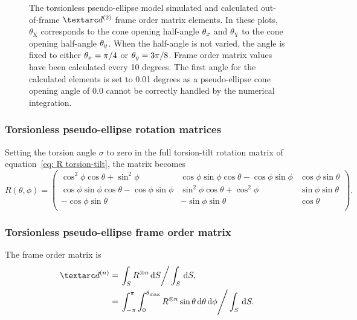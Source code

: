 \begin{figure}
\begin{tabular}{@{}cc@{}}
  \end{tabular}
  \caption[Torsionless pseudo-ellipse simulated and calculated out-of-frame $\FOtwo$ elements.]{
    The torsionless pseudo-ellipse model simulated and calculated out-of-frame $\FOtwo$ frame order matrix elements.
    In these plots, $\theta_\textrm{X}$ corresponds to the cone opening half-angle $\theta_x$ and $\theta_\textrm{Y}$ to the cone opening half-angle $\theta_y$.
    When the half-angle is not varied, the angle is fixed to either $\theta_x = \pi/4$ or $\theta_y = 3\pi/8$.
    Frame order matrix values have been calculated every 10 degrees.
    The first angle for the calculated elements is set to 0.01 degrees as a pseudo-ellipse cone opening angle of 0.0 cannot be correctly handled by the numerical integration.
  }
  \label{fig: simulated and calculated out-of-frame 2nd degree pseudo-ellipse, torsionless frame order}
\end{figure}


\subsubsection{Torsionless pseudo-ellipse rotation matrices}

Setting the torsion angle $\sigma$ to zero in the full torsion-tilt rotation matrix of equation~\ref{eq: R torsion-tilt}, the matrix becomes
\begin{equation}\label{eq: R torsionless}
    R(\theta, \phi) =
        \begin{pmatrix}
            \cos^2\phi \cos\theta + \sin^2\phi               & \cos\phi \sin\phi \cos\theta - \cos\phi \sin\phi & \cos\phi \sin\theta \\
            \cos\phi \sin\phi \cos\theta - \cos\phi \sin\phi & \sin^2\phi \cos\theta + \cos^2\phi               & \sin\phi \sin\theta \\
            - \cos\phi \sin\theta                            & - \sin\phi \sin\theta                            & \cos\theta \\
        \end{pmatrix}.
\end{equation}



\subsubsection{Torsionless pseudo-ellipse frame order matrix}

The frame order matrix is
\begin{subequations}
\begin{align}
    \FOn &= \left. \int_S R^{\otimes n} \diff S \right / \int_S \diff S, \\
         &= \left. \int_{-\pi}^{\pi} \int_{0}^{\conethetamax} R^{\otimes n} \sin\theta \diff\theta \diff\phi  \right / \int_S \diff S .
\end{align}
\end{subequations}

